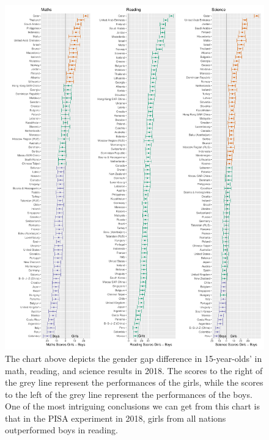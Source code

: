 \begin{Schunk}
\begin{figure}[H]
\includegraphics[width=1\linewidth]{learningtower_files/figure-latex/score-differences-1} \caption[The chart above depicts the gender gap difference in 15-year-olds' in math, reading, and science results in 2018]{The chart above depicts the gender gap difference in 15-year-olds' in math, reading, and science results in 2018. The scores to the right of the grey line represent the performances of the girls, while the scores to the left of the grey line represent the performances of the boys. One of the most intriguing conclusions we can get from this chart is that in the PISA experiment in 2018, girls from all nations outperformed boys in reading.}\label{fig:score-differences}
\end{figure}
\end{Schunk}

